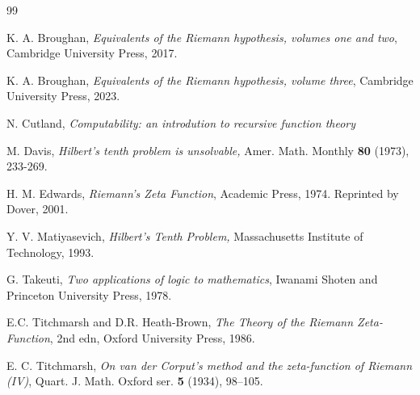 \documentclass[12pt]{article}
\begin{document}
\medskip

\begin{thebibliography}{99}

K. A. Broughan, {\it Equivalents of the Riemann hypothesis, volumes one and two}, Cambridge University Press, 2017.

K. A. Broughan, {\it Equivalents of the Riemann hypothesis, volume three}, Cambridge University Press, 2023.

N. Cutland, {\it Computability: an introdution to recursive function theory}

M. Davis, {\it Hilbert's tenth problem is unsolvable,} Amer. Math. Monthly {\bf 80} (1973), 233-269.

H. M. Edwards, \textit{Riemann's Zeta Function}, Academic Press,
1974. Reprinted by Dover, 2001.

Y. V. Matiyasevich, {\it Hilbert's Tenth Problem,} Massachusetts Institute of Technology, 1993.

G. Takeuti, {\it Two applications of logic to mathematics}, Iwanami Shoten and Princeton University Press, 1978.

E.C. Titchmarsh and D.R. Heath-Brown, {\it The Theory of the Riemann
Zeta-Function}, 2nd edn, Oxford University Press, 1986.

E. C. Titchmarsh, {\it On van der Corput's method and the zeta-function of Riemann (IV)}, Quart. J. Math. Oxford ser. {\bf 5} (1934), 98--105.
\end{thebibliography}
\end{document}
